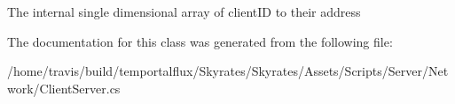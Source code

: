 The internal single dimensional array of client\-I\-D to their address 



The documentation for this class was generated from the following file\-:\begin{DoxyCompactItemize}
\item 
/home/travis/build/temportalflux/\-Skyrates/\-Skyrates/\-Assets/\-Scripts/\-Server/\-Network/Client\-Server.\-cs\end{DoxyCompactItemize}
